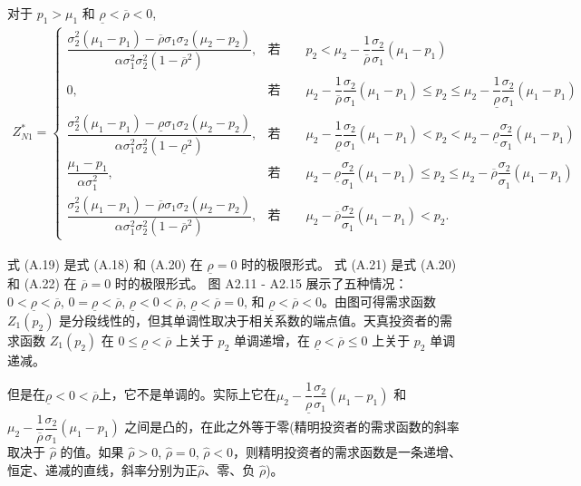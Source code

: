 \documentclass[10.0pt]{article}
\begin{document}
对于 $ p_1 > \mu_1 $ 和 $ \underline{\rho} < \overline{\rho} < 0 $,
{\footnotesize \begin{eqnarray}
Z_{N 1}^* = \left\{ \begin{matrix}
\dfrac{\sigma_2^2 (\mu_1 - p_1) - \overline{\rho} \sigma_1 \sigma_2 (\mu_2 - p_2)}{\alpha \sigma_1^2 \sigma_2^2 (1 - \overline{\rho}^2)}, & \text{若} \qquad p_2 < \mu_2 - \dfrac1{\overline{\rho}} \dfrac{\sigma_2}{\sigma_1} (\mu_1 - p_1) \\
0, & \text{若} \qquad \mu_2 - \dfrac1{\overline{\rho}} \dfrac{\sigma_2}{\sigma_1} (\mu_1 - p_1) \leqslant p_2 \leqslant \mu_2 - \dfrac1{\underline{\rho}} \dfrac{\sigma_2}{\sigma_1} (\mu_1 - p_1) \\
\dfrac{\sigma_2^2 (\mu_1 - p_1) - \underline{\rho} \sigma_1 \sigma_2 (\mu_2 - p_2)}{\alpha \sigma_1^2 \sigma_2^2 (1 - \underline{\rho}^2)}, & \text{若} \qquad \mu_2 - \dfrac1{\underline{\rho}} \dfrac{\sigma_2}{\sigma_1} (\mu_1 - p_1) < p_2 < \mu_2 - \underline{\rho} \dfrac{\sigma_2}{\sigma_1} (\mu_1 - p_1) \\
\dfrac{\mu_1 - p_1}{\alpha \sigma_1^2}, & \text{若} \qquad \mu_2 - \underline{\rho} \dfrac{\sigma_2}{\sigma_1} (\mu_1 - p_1) \leqslant p_2 \leqslant \mu_2 - \overline{\rho} \dfrac{\sigma_2}{\sigma_1} (\mu_1 - p_1) \\
\dfrac{\sigma_2^2 (\mu_1 - p_1) - \overline{\rho} \sigma_1 \sigma_2 (\mu_2 - p_2)}{\alpha \sigma_1^2 \sigma_2^2 (1 - \overline{\rho}^2)}, & \text{若} \qquad \mu_2 - \overline{\rho} \dfrac{\sigma_2}{\sigma_1} (\mu_1 - p_1) < p_2.
\end{matrix} \right.
\end{eqnarray}}



式 (A.19) 是式 (A.18) 和 (A.20) 在 $ \underline{\rho} = 0 $ 时的极限形式。
式 (A.21) 是式 (A.20) 和 (A.22) 在 $ \overline{\rho} = 0 $ 时的极限形式。
图 A2.11 - A2.15 展示了五种情况：  $ 0 < \underline{\rho} < \overline{\rho} $, $ 0 = \underline{\rho} < \overline{\rho} $, $ \underline{\rho} < 0 < \overline{\rho} $, $ \underline{\rho} < \overline{\rho} = 0 $, 和 $ \underline{\rho} < \overline{\rho} < 0 $。由图可得需求函数 $ Z_1 (p_2) $ 是分段线性的，但其单调性取决于相关系数的端点值。天真投资者的需求函数 $ Z_1 (p_2) $ 在 $ 0 \leqslant \underline{\rho} < \overline{\rho} $ 上关于 $ p_2 $ 单调递增，在 $ \underline{\rho} < \overline{\rho} \leqslant 0 $ 上关于 $ p_2 $ 单调递减。

但是在$ \underline{\rho} < 0 < \overline{\rho} $上，它不是单调的。实际上它在$ \mu_2 - \dfrac1{\underline{\rho}} \dfrac{\sigma_2}{\sigma_1} (\mu_1 - p_1) $ 和 $ \mu_2 - \dfrac1{\overline{\rho}} \dfrac{\sigma_2}{\sigma_1} (\mu_1 - p_1) $ 之间是凸的，在此之外等于零(精明投资者的需求函数的斜率取决于 $ \hat{\rho} $ 的值。如果 $ \hat{\rho} > 0 $, $ \hat{\rho} = 0 $, $ \hat{\rho} < 0 $，则精明投资者的需求函数是一条递增、恒定、递减的直线，斜率分别为正$ \hat{ \rho} $、零、负 $ \hat{ \rho} $)。
\end{document}
